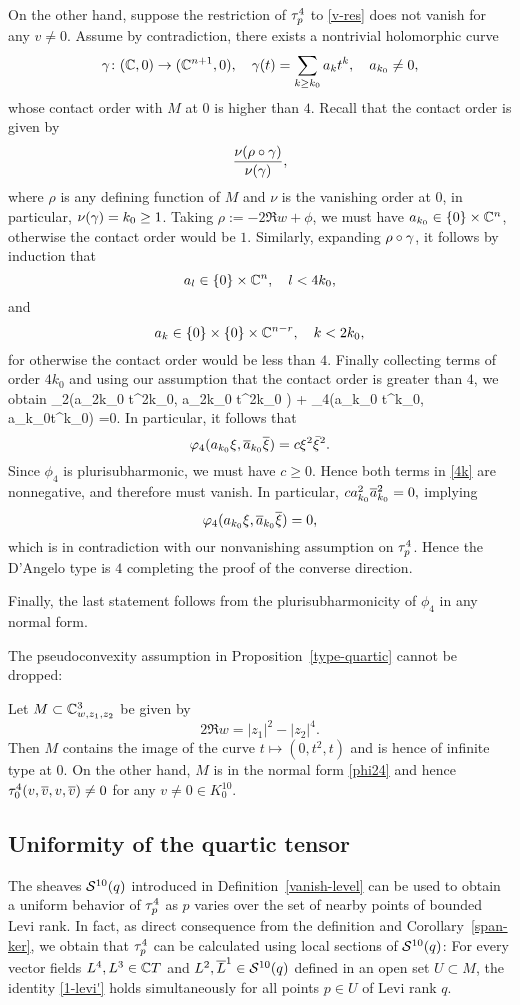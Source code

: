 \documentclass[12pt]{amsart}
\begin{document}
On the other hand, suppose the restriction of $\tau^4_p$ to \eqref{v-res} does not vanish for any 
$v\ne 0$. Assume by contradiction, 
there exists a nontrivial holomorphic curve 
$$
	\gamma\colon ({\mathbb{C}},0) \to ({\mathbb{C}}^{n+1},0),
	\quad
	\gamma(t) = \sum_{k\ge k_0} a_k t^k,
	\quad 
	a_{k_0}\ne 0,
$$
whose contact order with $M$ at $0$ is higher than $4$.
Recall that the contact order is given by
$$
	\frac{\nu(\rho\circ\gamma)}{\nu(\gamma)},
$$
where $\rho$ is any defining function of $M$ and $\nu$ is the vanishing order at $0$,
in particular, $\nu(\gamma) = k_0\ge 1$.
Taking $\rho := -2\Re w +\phi$, we must have $a_{k_0}\in \{0\} \times {\mathbb{C}}^n$,
otherwise the contact order would be $1$.
Similarly, expanding $\rho\circ \gamma$, it follows by induction that 
$$
	a_{l}\in \{0\} \times {\mathbb{C}}^{n},
	\quad
	l< 4k_0,
$$
and
$$
	a_{k}\in \{0\} \times \{0\} \times {\mathbb{C}}^{n-r},
	\quad
	k< 2k_0,
$$
for otherwise the contact order would be less than $4$.
Finally collecting terms of order $4k_0$
and using our assumption that the contact order is greater than $4$,
we obtain
\beq{}
 	\phi_2(a_{2k_0} t^{2k_0}, \1a_{2k_0} \1t^{2k_0} ) + \phi_4(a_{k_0} t^{k_0}, \1a_{k_0}\1t^{k_0}) =0.
\eeq
In particular, it follows that 
$$
	\varphi_4(a_{k_0} \xi, \overline{a}_{k_0}\overline{\xi}) = c\xi^2\bar\xi^2.
$$
Since $\phi_4$ is plurisubharmonic, we must have $c\ge 0$.
Hence both terms in \eqref{4k} are nonnegative,
and therefore must vanish.
In particular, 
$
	c a_{k_0}^2 \overline{a}_{k_0}^2 = 0,
$
implying 
$$
	\varphi_4(a_{k_0} \xi, \overline{a}_{k_0}\overline{\xi}) = 0,
$$
which is in contradiction with our nonvanishing assumption on $\tau^4_p$.
Hence the D'Angelo type is $4$ completing the proof of the converse direction.

Finally, the last statement follows from the plurisubharmonicity of $\phi_4$
in any normal form.
\epf


The pseudoconvexity assumption in Proposition~\ref{type-quartic} cannot be dropped:

\be
Let $M\subset {\mathbb{C}}^3_{w, z_1, z_2}$ be given by
$$
	2\Re w = |z_1|^2 - |z_2|^4.
$$
Then $M$ contains the image of the curve $t\mapsto (0, t^2, t)$ 
and is hence of infinite type at $0$.
On the other hand, $M$ is in the normal form \eqref{phi24}
and hence $\tau^4_0(v, \overline{v}, v, \overline{v})\ne 0$  for any $v\ne0\in K^{10}_0$.
\ee

\subsection{Uniformity of the quartic tensor}
The sheaves  ${\mathcal{S}}^{10}(q)$
introduced in Definition~\ref{vanish-level}
 can be used to 
obtain a uniform behavior of 
$\tau^4_p$ as $p$ varies
over the set of nearby points
of bounded Levi rank.
In fact, as direct consequence
from the definition and Corollary~\ref{span-ker}, 
we obtain
that  $\tau^4_p$
can be calculated using local sections of ${\mathcal{S}}^{10}(q)$:
\bc{}
For every 
vector fields $L^4, L^3\in {\mathbb{C}} T$
and $L^2, \overline{L}^1\in {\mathcal{S}}^{10}(q)$
defined in an open set $U\subset M$,
the identity 
\eqref{1-levi'} holds
simultaneously
for all points $p\in U$
of Levi rank $q$.
\ec
\end{document}
